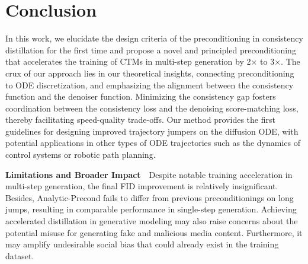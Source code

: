 \section{Conclusion}
In this work, we elucidate the design criteria of the preconditioning in consistency distillation for the first time and propose a novel and principled preconditioning that accelerates the training of CTMs in multi-step generation by 2$\times$ to 3$\times$. The crux of our approach lies in our theoretical insights, connecting preconditioning to ODE discretization, and emphasizing the alignment between the consistency function and the denoiser function. Minimizing the consistency gap fosters coordination between the consistency loss and the denoising score-matching loss, thereby facilitating speed-quality trade-offs. Our method provides the first guidelines for designing improved trajectory jumpers on the diffusion ODE, with potential applications in other types of ODE trajectories such as the dynamics of control systems or robotic path planning.

\textbf{Limitations and Broader Impact}$\mbox{  }$ Despite notable training acceleration in multi-step generation, the final FID improvement is relatively insignificant. Besides, Analytic-Precond fails to differ from previous preconditionings on long jumps, resulting in comparable performance in single-step generation. Achieving accelerated distillation in generative modeling may also raise concerns about the potential misuse for generating fake and malicious media content. Furthermore, it may amplify undesirable social bias that could already exist in the training dataset. 